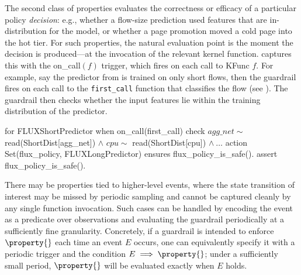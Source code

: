 The second class of properties evaluates the correctness or efficacy of a particular policy \emph{decision}: e.g., whether a flow-size prediction used features that are in-distribution for the model, or whether a page promotion moved a cold page into the hot tier.
For such properties, the natural evaluation point is the moment the decision is produced---at the invocation of the relevant kernel function.
\lang captures this with the {\sf on\_call}$(f)$ trigger, which fires on each call to \textsf{KFunc} $f$.
For example, say the predictor from  is trained on only short flows, then the guardrail fires on each call to the {\tt first\_call} function that classifies the flow (see ).
The guardrail then checks whether the input features lie within the training distribution of the predictor.
\begin{dslbox}[title={Guardrail~\theguardcount: Example guardrail to check in-distribution inputs for a neural network trained on short flows}, glabel=lst:in-dist-short]
for FLUXShortPredictor
when on_call(first_call)
check $agg\_net \sim$ read(ShortDist[agg_net]) $\wedge$
      $cpu \sim$ read(ShortDist[cpu]) $\wedge\ \dots$
action Set(flux_policy, FLUXLongPredictor)
ensures flux_policy_is_safe().
assert flux_policy_is_safe().
\end{dslbox}

There may be properties tied to higher-level events, where the state transition of interest may be missed by periodic sampling and cannot be captured cleanly by any single function invocation.
Such cases can be handled by encoding the event as a predicate over observations and evaluating the guardrail periodically at a sufficiently fine granularity.
Concretely, if a guardrail is intended to enforce $\property{}$ each time an event $E$ occurs, one can equivalently specify it with a periodic trigger and the condition $E\implies\property{}$; under a sufficiently small period, $\property{}$ will be evaluated exactly when $E$ holds.

